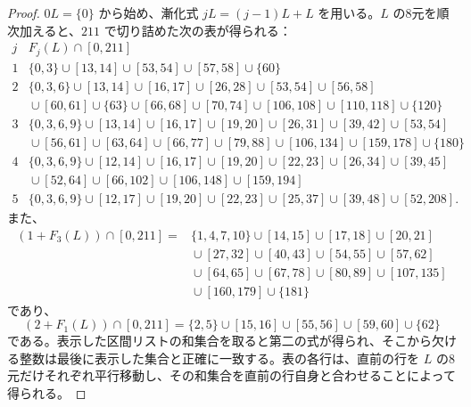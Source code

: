 \documentclass[12pt]{ltjsarticle}
\theoremstyle{plain}
\theoremstyle{definition}
\theoremstyle{plain}
\begin{document}
\begin{proof}
$0L=\{0\}$ から始め、漸化式 $jL=(j-1)L+L$ を用いる。$L$ の8元を順次加えると、$211$ で切り詰めた次の表が得られる：
\[
\begin{array}{c|l}
j & F_j(L)\cap[0,211]\\
\hline
1 & \{0,3\}\cup[13,14]\cup[53,54]\cup[57,58]\cup\{60\}\\
2 & \{0,3,6\}\cup[13,14]\cup[16,17]\cup[26,28]\cup[53,54]\cup[56,58]\\
  & {}\cup[60,61]\cup\{63\}\cup[66,68]\cup[70,74]\cup[106,108]\cup[110,118]\cup\{120\}\\
3 & \{0,3,6,9\}\cup[13,14]\cup[16,17]\cup[19,20]\cup[26,31]\cup[39,42]\cup[53,54]\\
  & {}\cup[56,61]\cup[63,64]\cup[66,77]\cup[79,88]\cup[106,134]\cup[159,178]\cup\{180\}\\
4 & \{0,3,6,9\}\cup[12,14]\cup[16,17]\cup[19,20]\cup[22,23]\cup[26,34]\cup[39,45]\\
  & {}\cup[52,64]\cup[66,102]\cup[106,148]\cup[159,194]\\
5 & \{0,3,6,9\}\cup[12,17]\cup[19,20]\cup[22,23]\cup[25,37]\cup[39,48]\cup[52,208].
\end{array}
\]
また、
\[
\begin{aligned}
(1+F_3(L))\cap[0,211]
={}&\{1,4,7,10\}\cup[14,15]\cup[17,18]\cup[20,21]\\
 &{}\cup[27,32]\cup[40,43]\cup[54,55]\cup[57,62]\\
 &{}\cup[64,65]\cup[67,78]\cup[80,89]\cup[107,135]\\
 &{}\cup[160,179]\cup\{181\}
\end{aligned}
\]
であり、
\[
 (2+F_1(L))\cap[0,211]
 =\{2,5\}\cup[15,16]\cup[55,56]\cup[59,60]\cup\{62\}
\]
である。表示した区間リストの和集合を取ると第二の式が得られ、そこから欠ける整数は最後に表示した集合と正確に一致する。表の各行は、直前の行を $L$ の8元だけそれぞれ平行移動し、その和集合を直前の行自身と合わせることによって得られる。
\end{proof}
\end{document}
